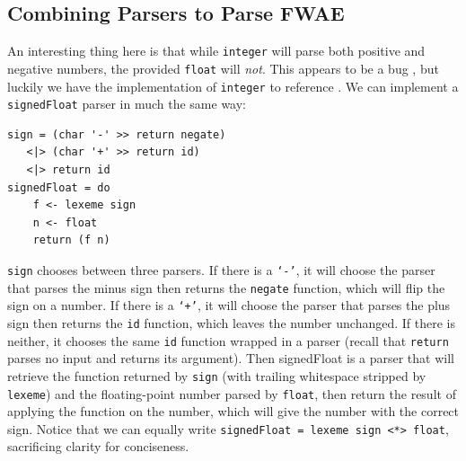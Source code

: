 \documentclass[format=acmlarge, review=false, nonacm=false, screen=true]{acmart}
\begin{document}
\subsection{Combining Parsers to Parse FWAE}
An interesting thing here is that while \texttt{integer} will parse both positive and negative numbers, the provided \texttt{float} will \textit{not}. This appears to be a bug \cite{parsec-bug}, but luckily we have the implementation of \texttt{integer} to reference \cite{token}. We can implement a \texttt{signedFloat} parser in much the same way:
\begin{verbatim}
sign = (char '-' >> return negate)
   <|> (char '+' >> return id)
   <|> return id
signedFloat = do
    f <- lexeme sign
    n <- float
    return (f n)
\end{verbatim}
\texttt{sign} chooses between three parsers. If there is a \texttt{`-'}, it will choose the parser that parses the minus sign then returns the \texttt{negate} function, which will flip the sign on a number. If there is a \texttt{`+'}, it will choose the parser that parses the plus sign then returns the \texttt{id} function, which leaves the number unchanged. If there is neither, it chooses the same \texttt{id} function wrapped in a parser (recall that \texttt{return} parses no input and returns its argument). Then signedFloat is a parser that will retrieve the function returned by \texttt{sign} (with trailing whitespace stripped by \texttt{lexeme}) and the floating-point number parsed by \texttt{float}, then return the result of applying the function on the number, which will give the number with the correct sign. Notice that we can equally write \texttt{signedFloat = lexeme sign <*> float}, sacrificing clarity for conciseness.

\end{document}
